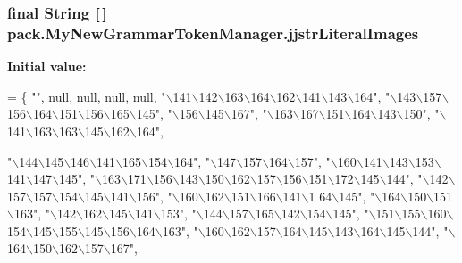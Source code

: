 \subsubsection[{\texorpdfstring{jjstr\+Literal\+Images}{jjstrLiteralImages}}]{\setlength{\rightskip}{0pt plus 5cm}final String \mbox{[}$\,$\mbox{]} pack.\+My\+New\+Grammar\+Token\+Manager.\+jjstr\+Literal\+Images\hspace{0.3cm}{\ttfamily [static]}}\hypertarget{classpack_1_1_my_new_grammar_token_manager_a0f57e0ac3d5944c66ce3638813cc2907}{}\label{classpack_1_1_my_new_grammar_token_manager_a0f57e0ac3d5944c66ce3638813cc2907}
{\bfseries Initial value\+:}
\begin{DoxyCode}
= \{
\textcolor{stringliteral}{""}, null, null, null, null, \textcolor{stringliteral}{"\(\backslash\)141\(\backslash\)142\(\backslash\)163\(\backslash\)164\(\backslash\)162\(\backslash\)141\(\backslash\)143\(\backslash\)164"}, 
\textcolor{stringliteral}{"\(\backslash\)143\(\backslash\)157\(\backslash\)156\(\backslash\)164\(\backslash\)151\(\backslash\)156\(\backslash\)165\(\backslash\)145"}, \textcolor{stringliteral}{"\(\backslash\)156\(\backslash\)145\(\backslash\)167"}, \textcolor{stringliteral}{"\(\backslash\)163\(\backslash\)167\(\backslash\)151\(\backslash\)164\(\backslash\)143\(\backslash\)150"}, \textcolor{stringliteral}{"\(\backslash\)141\(\backslash\)163\(\backslash\)163\(\backslash\)145\(\backslash\)162\(\backslash\)164"},
       
\textcolor{stringliteral}{"\(\backslash\)144\(\backslash\)145\(\backslash\)146\(\backslash\)141\(\backslash\)165\(\backslash\)154\(\backslash\)164"}, \textcolor{stringliteral}{"\(\backslash\)147\(\backslash\)157\(\backslash\)164\(\backslash\)157"}, \textcolor{stringliteral}{"\(\backslash\)160\(\backslash\)141\(\backslash\)143\(\backslash\)153\(\backslash\)141\(\backslash\)147\(\backslash\)145"}, 
\textcolor{stringliteral}{"\(\backslash\)163\(\backslash\)171\(\backslash\)156\(\backslash\)143\(\backslash\)150\(\backslash\)162\(\backslash\)157\(\backslash\)156\(\backslash\)151\(\backslash\)172\(\backslash\)145\(\backslash\)144"}, \textcolor{stringliteral}{"\(\backslash\)142\(\backslash\)157\(\backslash\)157\(\backslash\)154\(\backslash\)145\(\backslash\)141\(\backslash\)156"}, \textcolor{stringliteral}{"\(\backslash\)160\(\backslash\)162\(\backslash\)151\(\backslash\)166\(\backslash\)141\(\backslash\)1
      64\(\backslash\)145"}, 
\textcolor{stringliteral}{"\(\backslash\)164\(\backslash\)150\(\backslash\)151\(\backslash\)163"}, \textcolor{stringliteral}{"\(\backslash\)142\(\backslash\)162\(\backslash\)145\(\backslash\)141\(\backslash\)153"}, \textcolor{stringliteral}{"\(\backslash\)144\(\backslash\)157\(\backslash\)165\(\backslash\)142\(\backslash\)154\(\backslash\)145"}, 
\textcolor{stringliteral}{"\(\backslash\)151\(\backslash\)155\(\backslash\)160\(\backslash\)154\(\backslash\)145\(\backslash\)155\(\backslash\)145\(\backslash\)156\(\backslash\)164\(\backslash\)163"}, \textcolor{stringliteral}{"\(\backslash\)160\(\backslash\)162\(\backslash\)157\(\backslash\)164\(\backslash\)145\(\backslash\)143\(\backslash\)164\(\backslash\)145\(\backslash\)144"}, \textcolor{stringliteral}{"\(\backslash\)164\(\backslash\)150\(\backslash\)162\(\backslash\)157\(\backslash\)167"},
       

\end{DoxyCode}
